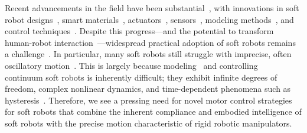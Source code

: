 Recent advancements in the field have been substantial~\cite{yasa2023overview}, with innovations in soft robot designs~\cite{laschi2012soft, hawkes2017soft, guan2023trimmed, katzschmann2018exploration, tolley2014resilient}, smart materials~\cite{terryn2017self, mazzolai2022roadmap}, actuators~\cite{shepherd2013using, vasios2020harnessing, lipton2018handedness, gravert2024low, wehner2016integrated, aubin2022towards}, sensors~\cite{larson2016highly, thuruthel2019soft, truby2020distributed}, modeling methods~\cite{renda2018discrete, boyer2020dynamics, renda2020geometric}, and control techniques~\cite{thuruthel2018model, della2020model, jitosho2023reinforcement, pustina2024input}. Despite this progress—and the potential to transform human-robot interaction~\cite{jorgensen2022soft}—widespread practical adoption of soft robots remains a challenge~\cite{hawkes2021hard}. In particular, many soft robots still struggle with imprecise, often oscillatory motion~\cite{mazzolai2022roadmap, majidi2014soft, hawkes2017soft}. This is largely because modeling~\cite{armanini2023soft} and controlling~\cite{della2023model} continuum soft robots is inherently difficult; they exhibit infinite degrees of freedom, complex nonlinear dynamics, and time-dependent phenomena such as hysteresis~\cite{armanini2023soft}.
Therefore, we see a pressing need for novel motor control strategies for soft robots that combine the inherent compliance and embodied intelligence of soft robots with the precise motion characteristic of rigid robotic manipulators.

